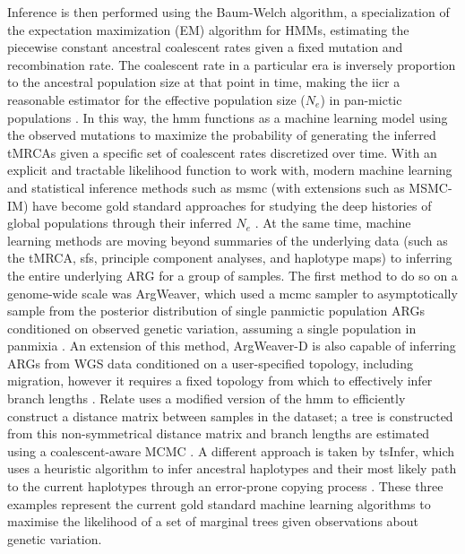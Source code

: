 Inference is then performed using the Baum-Welch algorithm, a specialization of the expectation maximization (EM) algorithm for HMMs, estimating the piecewise constant ancestral coalescent rates given a fixed mutation and recombination rate. The coalescent rate in a particular era is inversely proportion to the ancestral population size at that point in time, making the \gls{iicr} a reasonable estimator for the effective population size ($N_e$) in pan-mictic populations \cite{Chikhi2018}. In this way, the \gls{hmm} functions as a machine learning model using the observed mutations to maximize the probability of generating the inferred tMRCAs given a specific set of coalescent rates discretized over time. With an explicit and tractable likelihood function to work with, modern machine learning and statistical inference methods such as \gls{msmc} (with extensions such as MSMC-IM) have become gold standard approaches for studying the deep histories of global populations through their inferred $N_e$ \cite{Wang2020,Fan2019b,Schiffels2014c}. At the same time, machine learning methods are moving beyond summaries of the underlying data (such as the tMRCA, \gls{sfs}, principle component analyses, and haplotype maps) to inferring the entire underlying ARG for a group of samples. The first method to do so on a genome-wide scale was ArgWeaver, which used a \gls{mcmc} sampler to asymptotically sample from the posterior distribution of single panmictic population ARGs conditioned on observed genetic variation, assuming a single population in panmixia \cite{Rasmussen2014a}. An extension of this method, ArgWeaver-D is also capable of inferring ARGs from WGS data conditioned on a user-specified topology, including migration, however it requires a fixed topology from which to effectively infer branch lengths \cite{Hubisz2020}. Relate uses a modified version of the \textcite{N2003} \gls{hmm} to efficiently construct a distance matrix between samples in the dataset; a tree is constructed from this non-symmetrical distance matrix and branch lengths are estimated using a coalescent-aware MCMC \cite{Speidel2019a}. A different approach is taken by tsInfer, which uses a heuristic algorithm to infer ancestral haplotypes and their most likely path to the current haplotypes through an error-prone copying process \cite{Kelleher2019a}. These three examples represent the current gold standard machine learning algorithms to maximise the likelihood of a set of marginal trees given observations about genetic variation.

